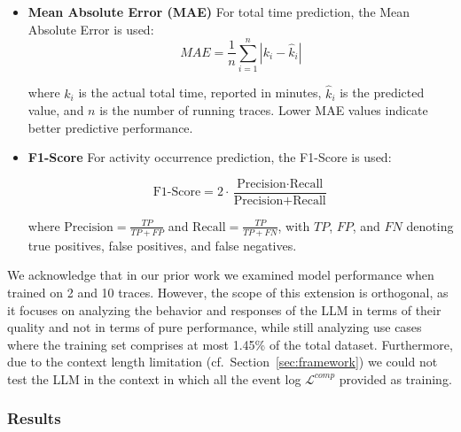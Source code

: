 \documentclass[manuscript,screen,review]{acmart}
\newcommand{\ML}{\mathcal{L}}
\newcommand{\mysum}{\displaystyle \sum_{i=1}^n}
\begin{document}
\begin{itemize}
\item \textbf{Mean Absolute Error (MAE)} \enspace
For total time prediction, the Mean Absolute Error is used:
\[
    MAE = \frac{1}{n}\mysum |k_i - \hat{k}_i|
\]

where $k_i$ is the actual total time, reported in minutes, $\hat{k}_i$ is the predicted value, and $n$ is the number of running traces. Lower MAE values indicate better predictive performance.

\item \textbf{F1-Score} \enspace
For activity occurrence prediction, the F1-Score is used:

$$\text{F1-Score} = 2 \cdot \frac{\text{Precision} \cdot \text{Recall}}{\text{Precision} + \text{Recall}}$$

where $\text{Precision} = \frac{TP}{TP + FP}$ and $\text{Recall} = \frac{TP}{TP + FN}$, with $TP$, $FP$, and $FN$ denoting true positives, false positives, and false negatives.

\end{itemize}


We acknowledge that in our prior work we examined model performance when trained on 2 and 10 traces. However, the scope of this extension is orthogonal, as it focuses on analyzing the behavior and responses of the LLM in terms of their quality and not in terms of pure performance, while still analyzing use cases where the training set comprises at most 1.45\% of the total dataset. Furthermore, due to the context length limitation (cf.\ Section~\ref{sec:framework}) we could not test the LLM in the context in which all the event log $\ML^{comp}$ provided as training.

\subsubsection{Results}
\end{document}
